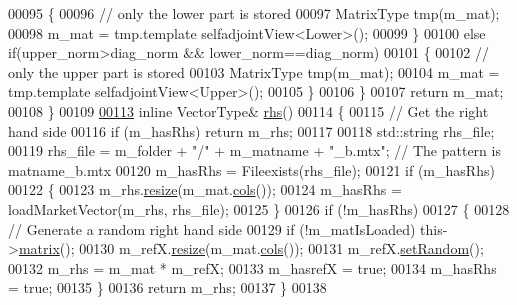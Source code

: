 \begin{DoxyCode}
00095         \{
00096           \textcolor{comment}{// only the lower part is stored}
00097           MatrixType tmp(m\_mat);
00098           m\_mat = tmp.template selfadjointView<Lower>();
00099         \}
00100         \textcolor{keywordflow}{else} \textcolor{keywordflow}{if}(upper\_norm>diag\_norm && lower\_norm==diag\_norm)
00101         \{
00102           \textcolor{comment}{// only the upper part is stored}
00103           MatrixType tmp(m\_mat);
00104           m\_mat = tmp.template selfadjointView<Upper>();
00105         \}
00106       \}
00107       \textcolor{keywordflow}{return} m\_mat; 
00108     \}
00109     
\hyperlink{class_eigen_1_1_matrix_market_iterator_ac141e537f3bc3a3c078a2780a6a956b6}{00113}     \textcolor{keyword}{inline} VectorType& \hyperlink{class_eigen_1_1_matrix_market_iterator_ac141e537f3bc3a3c078a2780a6a956b6}{rhs}() 
00114     \{ 
00115        \textcolor{comment}{// Get the right hand side}
00116       \textcolor{keywordflow}{if} (m\_hasRhs) \textcolor{keywordflow}{return} m\_rhs;
00117       
00118       std::string rhs\_file;
00119       rhs\_file = m\_folder + \textcolor{stringliteral}{"/"} + m\_matname + \textcolor{stringliteral}{"\_b.mtx"}; \textcolor{comment}{// The pattern is matname\_b.mtx}
00120       m\_hasRhs = Fileexists(rhs\_file);
00121       \textcolor{keywordflow}{if} (m\_hasRhs)
00122       \{
00123         m\_rhs.\hyperlink{class_eigen_1_1_plain_object_base_a99d9054ee2d5a40c6e00ded0265e9cea}{resize}(m\_mat.\hyperlink{group___sparse_core___module_aa391750e3c530227e4a5c3c52e959975}{cols}());
00124         m\_hasRhs = loadMarketVector(m\_rhs, rhs\_file);
00125       \}
00126       \textcolor{keywordflow}{if} (!m\_hasRhs)
00127       \{
00128         \textcolor{comment}{// Generate a random right hand side}
00129         \textcolor{keywordflow}{if} (!m\_matIsLoaded) this->\hyperlink{class_eigen_1_1_matrix_market_iterator_ac938961d685306ef5b48d9943f7dcabd}{matrix}(); 
00130         m\_refX.\hyperlink{class_eigen_1_1_plain_object_base_a99d9054ee2d5a40c6e00ded0265e9cea}{resize}(m\_mat.\hyperlink{group___sparse_core___module_aa391750e3c530227e4a5c3c52e959975}{cols}());
00131         m\_refX.\hyperlink{class_eigen_1_1_plain_object_base_af0e576a0e1aefc9ee346de44cc352ba3}{setRandom}();
00132         m\_rhs = m\_mat * m\_refX;
00133         m\_hasrefX = \textcolor{keyword}{true};
00134         m\_hasRhs = \textcolor{keyword}{true};
00135       \}
00136       \textcolor{keywordflow}{return} m\_rhs; 
00137     \}
00138     

\end{DoxyCode}
